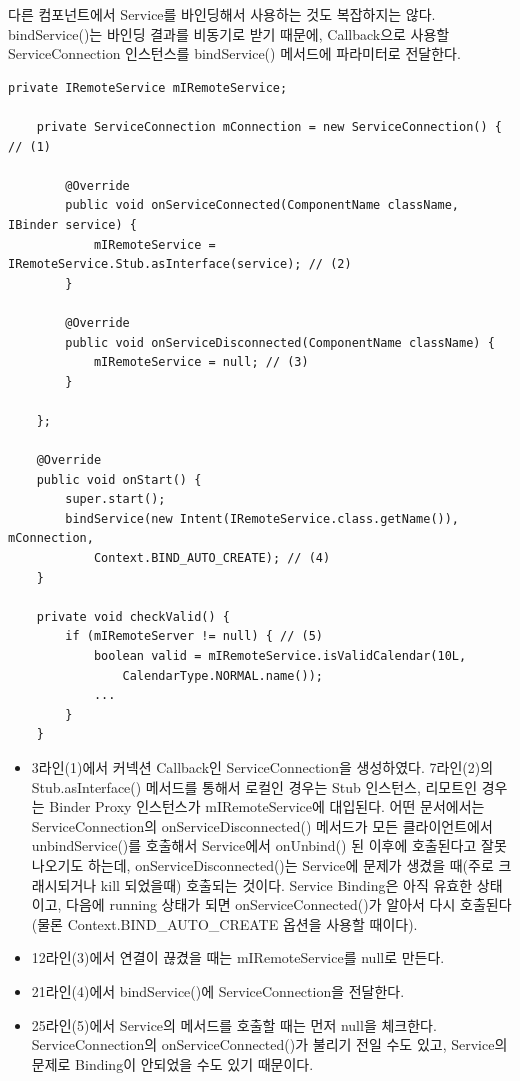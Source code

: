 다른 컴포넌트에서 Service를 바인딩해서 사용하는 것도 복잡하지는 않다. 
bindService()는 바인딩 결과를 비동기로 받기 때문에, Callback으로 사용할 ServiceConnection 인스턴스를 bindService() 메서드에 파라미터로 전달한다.
\begin{lstlisting}[frame=single]
	private IRemoteService mIRemoteService;

	private ServiceConnection mConnection = new ServiceConnection() { // (1)

		@Override
    	public void onServiceConnected(ComponentName className, IBinder service) {
        	mIRemoteService = IRemoteService.Stub.asInterface(service); // (2)
    	}

    	@Override
    	public void onServiceDisconnected(ComponentName className) {
        	mIRemoteService = null; // (3)
    	}
    	
	};

	@Override
	public void onStart() {
		super.start();
		bindService(new Intent(IRemoteService.class.getName()), mConnection,
			Context.BIND_AUTO_CREATE); // (4)
	}
	
	private void checkValid() {
		if (mIRemoteServer != null) { // (5)
			boolean valid = mIRemoteService.isValidCalendar(10L,
				CalendarType.NORMAL.name());
			...
		}	
	}
\end{lstlisting}
\begin{itemize}
\item 3라인(1)에서 커넥션 Callback인 ServiceConnection을 생성하였다. 
7라인(2)의 Stub.asInter\-face() 메서드를 통해서 로컬인 경우는 Stub 인스턴스, 리모트인 경우는 Binder Proxy 인스턴스가 mIRemoteService에 대입된다.
어떤 문서에서는 ServiceConnection의 onServiceDisconnected() 메서드가 모든 클라이언트에서 unbindService()를 호출해서 Service에서 onUnbind() 된 이후에 호출된다고 잘못 나오기도 하는데, onServiceDisconnected()는 Service에 문제가 생겼을 때(주로 크래시되거나 kill 되었을때) 호출되는 것이다.
Service Binding은 아직 유효한 상태이고, 다음에 running 상태가 되면 onServiceConnected()가 알아서 다시 호출된다(물론 Context.BIND\_AUTO\_CREATE 옵션을 사용할 때이다).
\item 12라인(3)에서 연결이 끊겼을 때는 mIRemoteService를 null로 만든다.
\item 21라인(4)에서 bindService()에 ServiceConnection을 전달한다.
\item 25라인(5)에서 Service의 메서드를 호출할 때는 먼저 null을 체크한다. ServiceConnection의 onServiceConnected()가 불리기 전일 수도 있고, Service의 문제로 Binding이 안되었을 수도 있기 때문이다.
\end{itemize}


